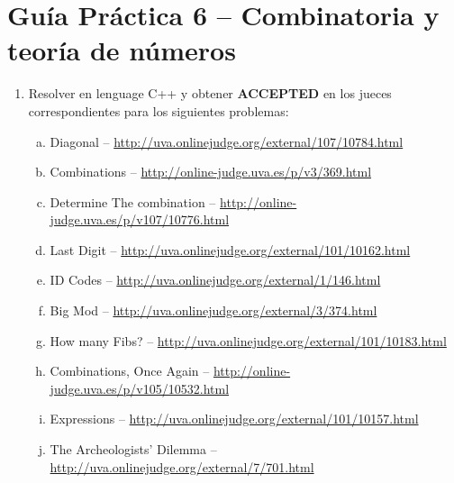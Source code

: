 




\section*{Gu\'ia Pr\'actica 6 -- Combinatoria y teoría de números}

\begin{enumerate}[1 -]
	
	\item Resolver en lenguage C++ y obtener \textbf{ACCEPTED} en los jueces correspondientes para los siguientes problemas:
	
	\begin{enumerate}[a)]
		\item Diagonal -- \href{http://uva.onlinejudge.org/external/107/10784.html}{http://uva.onlinejudge.org/external/107/10784.html}
     	\item Combinations -- \href{http://online-judge.uva.es/p/v3/369.html}{http://online-judge.uva.es/p/v3/369.html}
		\item Determine The combination -- \href{http://online-judge.uva.es/p/v107/10776.html}{http://online-judge.uva.es/p/v107/10776.html}     	
     	\item Last Digit -- \href{http://uva.onlinejudge.org/external/101/10162.html}{http://uva.onlinejudge.org/external/101/10162.html}
		\item ID Codes -- \href{http://uva.onlinejudge.org/external/1/146.html}{http://uva.onlinejudge.org/external/1/146.html}     	
		\item Big Mod -- \href{http://uva.onlinejudge.org/external/3/374.html}{http://uva.onlinejudge.org/external/3/374.html}
     	\item How many Fibs? -- \href{http://uva.onlinejudge.org/external/101/10183.html}{http://uva.onlinejudge.org/external/101/10183.html}
		\item Combinations, Once Again -- \href{http://online-judge.uva.es/p/v105/10532.html}{http://online-judge.uva.es/p/v105/10532.html}     	
     	\item Expressions -- \href{http://uva.onlinejudge.org/external/101/10157.html}{http://uva.onlinejudge.org/external/101/10157.html}
		\item The Archeologists’ Dilemma -- \href{http://uva.onlinejudge.org/external/7/701.html}{http://uva.onlinejudge.org/external/7/701.html}     	
	\end{enumerate}

\end{enumerate}






